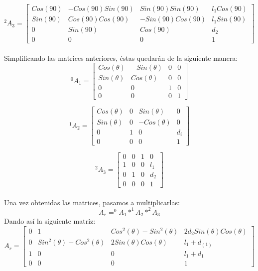 \documentclass[11pt,a4paper,oldfontcommands,oneside]{memoir}
\begin{document}
\[^{2}A_{3}= 
\begin{bmatrix}
    Cos(90)       & -Cos(90)Sin(90) & Sin(90)Sin(90) & l_{1}Cos(90) \\
    
    Sin(90)       & Cos(90)Cos(90) & -Sin(90)Cos(90)  & l_{1}Sin(90) \\
    
    0       & Sin(90) & Cos(90) & d_{2} \\
    
    0       & 0 & 0  & 1
\end{bmatrix}
\] \\

Simplificando las matrices anteriores, éstas quedarán de la siguiente manera:\\

\[^{0}A_{1}= 
\begin{bmatrix}
    Cos(\theta)       & -Sin(\theta) & 0 & 0 \\
    
    Sin(\theta)       & Cos(\theta) & 0  & 0 \\
    
    0       & 0 & 1 & 0 \\
    
    0       & 0 & 0  & 1
\end{bmatrix}
\]

\[^{1}A_{2}= 
\begin{bmatrix}
    Cos(\theta)       & 0 & Sin(\theta) & 0 \\
    
    Sin(\theta)       & 0 & -Cos(\theta)  & 0 \\
    
    0       & 1 & 0 & d_{i} \\
    
    0       & 0 & 0  & 1
\end{bmatrix}
\]

\[^{2}A_{3}= 
\begin{bmatrix}
    0       & 0 & 1 & 0 \\
    
    1       & 0 & 0  & l_{1} \\
    
    0       & 1 & 0 & d_{2} \\
    
    0       & 0 & 0  & 1
\end{bmatrix}
\] \\
Una vez obtenidas las matrices, pasamos a multiplicarlas: \\
\[A_{r}= ^{0}A_{1}*^{1}A_{2}*^{2}A_{3}
\]
Dando así la siguiente matriz: \\
\[A_{r}= 
\begin{bmatrix}
    0 & 1 & Cos^{2}(\theta)-Sin^{2}(\theta) & 2d_{2}Sin(\theta)Cos(\theta) \\
    
    0 & Sin^{2}(\theta)-Cos^{2}(\theta) & 2Sin(\theta)Cos(\theta)  & l_{1}+d_(1) \\
    
    1 & 0 & 0 & l_{1}+d_{1} \\
    
    0 & 0 & 0  & 1
\end{bmatrix}
\]
\end{document}
